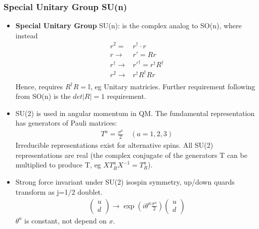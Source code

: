 \subsubsection{Special Unitary Group SU(n)}
\begin{itemize}
    \item \textbf{Special Unitary Group} SU(n): is the complex analog to SO(n), where instead \cite{robinson}
    \begin{equation}\begin{split}
    r^2=&r^\dagger\cdot r \\
    r\to&r'=Rr \\
    r^\dagger\to&r'^\dagger=r^\dagger R^\dagger \\
    r^2\to&r^\dagger R^\dagger Rr \\
    \end{split}\end{equation}
    Hence, requires $R^\dagger R=\mathbb{I}$, eg Unitary matricies. Further requirement following from SO(n) is the $det|R|=1$ requirement.
        \item SU(2) is used in angular momentum in QM. The fundamental representation has generators of Pauli matrices: \cite{wells}
        \begin{equation}\begin{split}
        T^a=\frac{\sigma^a}{2}\quad(a=1,2,3)
        \end{split}\end{equation}
        Irreducible representations exist for alternative spins. All SU(2) representations are real (the complex conjugate of the generators T can be multiplied to produce T, eg $XT_{\overline{R}}^aX^{-1}=T_R^a$).
        \item Strong force invariant under SU(2) isospin symmetry, up/down quards transform as j=1/2 doublet. \cite{wells}
        \begin{equation}\begin{split}
        \begin{pmatrix}u\\d\end{pmatrix}\to\exp{\left(i\theta^a\frac{\sigma^a}{2}\right)}\begin{pmatrix}u\\d\end{pmatrix}
        \end{split}\end{equation}
        $\theta^a$ is constant, not depend on $x$.

\end{itemize}

